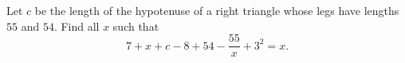 Let $c$ be the length of the hypotenuse of a right triangle whose legs have lengths $55$ and $54$. Find all $x$ such that
\[
7+x+c-8+54-\dfrac{55}{x}+3^2=x .
\]
